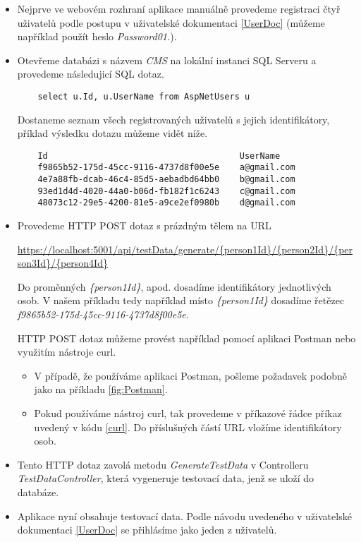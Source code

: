 \begin{itemize}
	\item Nejprve ve webovém rozhraní aplikace manuálně provedeme registraci čtyř uživatelů podle postupu v uživatelské dokumentaci \ref{UserDoc} (můžeme například použít heslo \textit{Password01.}).

	\item Otevřeme databázi s názvem \textit{CMS} na lokální instanci SQL Serveru a provedeme následujicí SQL dotaz.
	\begin{lstlisting}
	select u.Id, u.UserName from AspNetUsers u
	\end{lstlisting}
	
	Dostaneme seznam všech registrovaných uživatelů s jejich identifikátory, příklad výsledku dotazu můžeme vidět níže.
	
	\begin{lstlisting}
	Id										UserName
	f9865b52-175d-45cc-9116-4737d8f00e5e	a@gmail.com
	4e7a88fb-dcab-46c4-85d5-aebadbd64bb0	b@gmail.com
	93ed1d4d-4020-44a0-b06d-fb182f1c6243	c@gmail.com
	48073c12-29e5-4200-81e5-a9ce2ef0980b	d@gmail.com
	\end{lstlisting}
	
	\item Provedeme HTTP POST dotaz s prázdným tělem na URL
	
	\url{https://localhost:5001/api/testData/generate/{person1Id}/{person2Id}/{person3Id}/{person4Id}}
	
	Do proměnných \textit{\{person1Id\}}, apod. dosadíme identifikátory jednotlivých osob. V našem příkladu tedy například místo \textit{\{person1Id\}} dosadíme řetězec \textit{f9865b52-175d-45cc-9116-4737d8f00e5e}.
	
	HTTP POST dotaz můžeme provést například pomocí aplikaci Postman nebo využitím nástroje curl.
	
	\begin{itemize}
		\item V případě, že používáme aplikaci Postman, pošleme požadavek podobně jako na příkladu \ref{fig:Postman}.
		\item Pokud používáme nástroj curl, tak provedeme v příkazové řádce příkaz uvedený v kódu \ref{curl}. Do příslušných částí URL vložíme identifikátory osob.
	\end{itemize}

	\item Tento HTTP dotaz zavolá metodu \textit{GenerateTestData} v Controlleru \textit{TestDataController}, která vygeneruje testovací data, jenž se uloží do databáze. 
	
	\item Aplikace nyní obsahuje testovací data. Podle návodu uvedeného v uživatelské dokumentaci \ref{UserDoc} se přihlásíme jako jeden z uživatelů.
\end{itemize}


